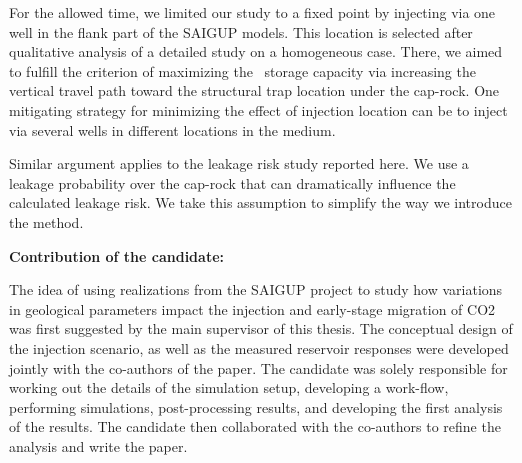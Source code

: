 {For the allowed time, we limited our study to a fixed point by injecting via one well in the flank part of the SAIGUP models. This location is selected after qualitative analysis of a detailed study on a homogeneous case. There, we aimed to fulfill the criterion of maximizing the \coo\ storage capacity via increasing the vertical travel path toward the structural trap location under the cap-rock. One mitigating strategy for minimizing the effect of injection location can be to inject via several wells in different locations in the medium.  

Similar argument applies to the leakage risk study reported here. We use a leakage probability over the cap-rock that can dramatically influence the calculated leakage risk. We take this assumption to simplify the way we introduce the method. 

\vspace{0.5cm}
\noindent\textbf{Contribution of the candidate:}

The idea of using realizations from the SAIGUP project to study how variations in geological parameters impact the injection and early-stage migration of CO2 was first suggested by the main supervisor of this thesis. The conceptual design of the injection scenario, as well as the measured reservoir responses were developed jointly with the co-authors of the paper. The candidate was solely responsible for working out the details of the simulation setup, developing a work-flow, performing simulations, post-processing results, and developing the first analysis of the results. The candidate then collaborated with the co-authors to refine the analysis and write the paper.
}

